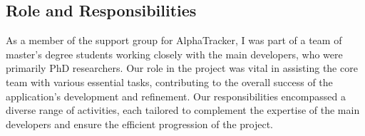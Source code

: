 \documentclass[
  11pt,
]{article}
\begin{document}
\hypertarget{role-and-responsibilities}{%
\subsection{Role and Responsibilities}\label{role-and-responsibilities}}

As a member of the support group for AlphaTracker, I was part of a team
of master's degree students working closely with the main developers,
who were primarily PhD researchers. Our role in the project was vital in
assisting the core team with various essential tasks, contributing to
the overall success of the application's development and refinement. Our
responsibilities encompassed a diverse range of activities, each
tailored to complement the expertise of the main developers and ensure
the efficient progression of the project.
\end{document}
